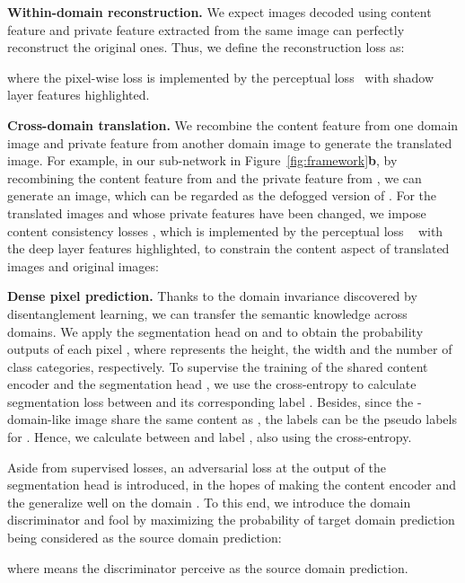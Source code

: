 \documentclass[10pt,twocolumn,letterpaper]{article}
\newcommand{\heading}[1]{\noindent\textbf{#1}}
\begin{document}
\heading{Within-domain reconstruction.} 
We expect images decoded using content feature  and private feature  extracted from the same image can perfectly reconstruct the original ones. 
Thus, we define the reconstruction loss as:
\vspace{-1mm}

where the pixel-wise loss  is implemented by the perceptual loss~\cite{simonyan2014very} with shadow layer features highlighted. 


\heading{Cross-domain translation.} 
We recombine the content feature  from one domain image and private feature  from another domain image to generate the translated image.
For example, in our sub-network  in Figure~\ref{fig:framework}\textbf{b}, by recombining the content feature  from  and the private feature  from , we can generate an image, which can be regarded as the defogged version of .
For the translated images  and  whose private features have been changed, we impose content consistency losses , which is implemented by the perceptual loss ~\cite{simonyan2014very} with the deep layer features highlighted, to constrain the content aspect of translated images and original images:
\vspace{-1mm}



\heading{Dense pixel prediction.}
Thanks to the domain invariance discovered by disentanglement learning, we can transfer the semantic knowledge across domains.
We apply the segmentation head  on  and  to obtain the probability outputs of each pixel , 
where  represents the height, the width and the number of class categories, respectively.
To supervise the training of the shared content encoder  and the segmentation head ,
we use the cross-entropy to calculate segmentation loss  between  and its corresponding label .
Besides, since the -domain-like image  share the same content as , the labels  can be the pseudo labels for . Hence, we calculate  between  and label , also using the cross-entropy.


Aside from supervised losses, an adversarial loss  at the output of the segmentation head  is introduced, in the hopes of making the content encoder  and the  generalize well on the domain . To this end, we introduce the domain discriminator  and fool  by maximizing the probability of target domain prediction  being considered as the source domain prediction:

where  means the discriminator  perceive  as the source domain prediction. 
\end{document}
